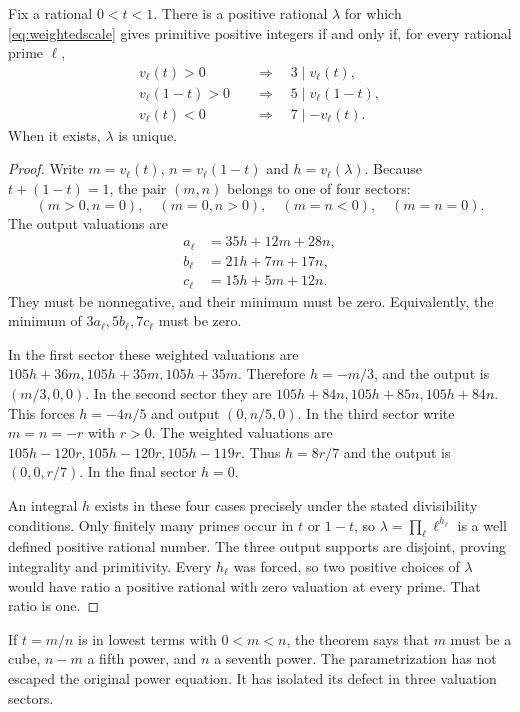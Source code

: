 \begin{theorem}\label{thm:scaling}
Fix a rational $0<t<1$. There is a positive rational $\lambda$ for which \eqref{eq:weightedscale} gives primitive positive integers if and only if, for every rational prime $\ell$,
\begin{align*}
v_\ell(t)>0&\quad\Longrightarrow\quad3\mid v_\ell(t),\\
v_\ell(1-t)>0&\quad\Longrightarrow\quad5\mid v_\ell(1-t),\\
v_\ell(t)<0&\quad\Longrightarrow\quad7\mid -v_\ell(t).
\end{align*}
When it exists, $\lambda$ is unique.
\end{theorem}
\begin{proof}
Write $m=v_\ell(t)$, $n=v_\ell(1-t)$ and $h=v_\ell(\lambda)$. Because $t+(1-t)=1$, the pair $(m,n)$ belongs to one of four sectors:
\[
(m>0,n=0),\quad(m=0,n>0),\quad(m=n<0),\quad(m=n=0).
\]
The output valuations are
\begin{align*}
a_\ell&=35h+12m+28n,\\
b_\ell&=21h+7m+17n,\\
c_\ell&=15h+5m+12n.
\end{align*}
They must be nonnegative, and their minimum must be zero. Equivalently, the minimum of $3a_\ell,5b_\ell,7c_\ell$ must be zero.

In the first sector these weighted valuations are $105h+36m,105h+35m,105h+35m$. Therefore $h=-m/3$, and the output is $(m/3,0,0)$. In the second sector they are $105h+84n,105h+85n,105h+84n$. This forces $h=-4n/5$ and output $(0,n/5,0)$. In the third sector write $m=n=-r$ with $r>0$. The weighted valuations are $105h-120r,105h-120r,105h-119r$. Thus $h=8r/7$ and the output is $(0,0,r/7)$. In the final sector $h=0$.

An integral $h$ exists in these four cases precisely under the stated divisibility conditions. Only finitely many primes occur in $t$ or $1-t$, so $\lambda=\prod_\ell\ell^{h_\ell}$ is a well defined positive rational number. The three output supports are disjoint, proving integrality and primitivity. Every $h_\ell$ was forced, so two positive choices of $\lambda$ would have ratio a positive rational with zero valuation at every prime. That ratio is one.
\end{proof}
If $t=m/n$ is in lowest terms with $0<m<n$, the theorem says that $m$ must be a cube, $n-m$ a fifth power, and $n$ a seventh power. The parametrization has not escaped the original power equation. It has isolated its defect in three valuation sectors.

